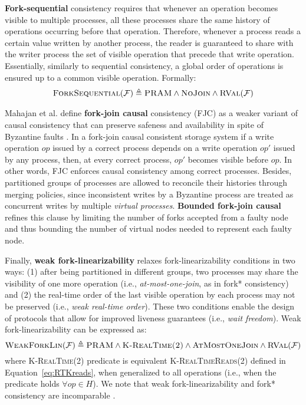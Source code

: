 \documentclass[letter, 11pt]{article}
\newcommand{\RVAL}{\textsc{RVal}(\mathcal{F})}
\renewcommand{\cite}{\citep}
\begin{document}
\textbf{Fork-sequential} consistency \cite{Oprea.Reiter:06,Cachin.Keidar.ea:09a} requires that 
whenever an operation becomes visible to multiple processes, 
all these processes share the same history of operations occurring before that operation.
Therefore, whenever a process reads a certain value written by another process,
the reader is guaranteed to share with the writer process the set of visible operation that precede that write operation.
Essentially, similarly to sequential consistency, a global order of operations is ensured
up to a common visible operation. Formally:
\begin{align}
\textsc{ForkSequential}(\mathcal{F}) \triangleq \textsc{PRAM} \wedge \textsc{NoJoin} \wedge{\RVAL} 
\end{align}

Mahajan et al. define \textbf{fork-join causal} consistency (FJC) as a
weaker variant of causal consistency that can preserve safeness and availability in spite of Byzantine faults \cite{Mahajan.Setty.ea:10}.
In a fork-join causal consistent storage system if a write operation $op$ issued by a correct process 
depends on a write operation $op'$ issued by any process, then, at every correct process, $op'$ becomes visible before $op$.
In other words, FJC enforces causal consistency among correct processes.
Besides, partitioned groups of processes are allowed to reconcile their histories through merging policies,
since inconsistent writes by a Byzantine process are treated as 
concurrent writes by multiple \emph{virtual processes}.
\textbf{Bounded fork-join causal} \cite{P-Mahajan.Dahlin:11} refines this clause by limiting
the number of forks accepted from a faulty node and thus bounding the number of virtual nodes
needed to represent each faulty node.

Finally, \textbf{weak fork-linearizability} \cite{Cachin.Keidar.ea:11} relaxes fork-linearizability conditions
in two ways: (1) after being partitioned in different groups, two processes may 
share the visibility of one more operation
(i.e., \emph{at-most-one-join}, as in fork* consistency) 
and (2) the real-time order of the last visible operation by each process may not be preserved (i.e., \emph{weak real-time order}).
These two conditions enable the design of protocols that allow for improved liveness guarantees (i.e., \emph{wait freedom}).
Weak fork-linearizability can be expressed as:
\begin{equation}
\textsc{WeakForkLin}(\mathcal{F}) \triangleq  
\textsc{PRAM} \wedge \textsc{K-RealTime(2)} \wedge \textsc{AtMostOneJoin} \wedge{\RVAL} 
\end{equation}
where \textsc{K-RealTime}(2) predicate is equivalent \textsc{K-RealTimeReads}(2) defined in Equation~\ref{eq:RTKreads}, when generalized to all operations (i.e., when the predicate holds $\forall op \in H$).
We note that weak fork-linearizability and fork* consistency are incomparable \cite{Cachin.Keidar.ea:11}.
\end{document}
